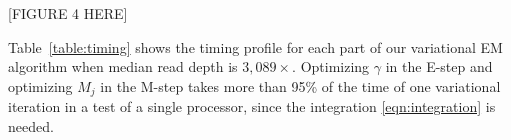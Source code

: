 \documentclass{bmcart}
\begin{document}
\vspace{2em}
\begin{center}
[FIGURE 4 HERE]  
\end{center}
\vspace{2em}


Table~\ref{table:timing} shows the timing profile for each part of our variational EM algorithm when median read depth is $3,089\times$.
Optimizing $\gamma$ in the E-step and optimizing $M_j$ in the M-step takes more than 95\% of the time of one variational iteration in a test of a single processor, since the integration \eqref{eqn:integration} is needed.
\end{document}
